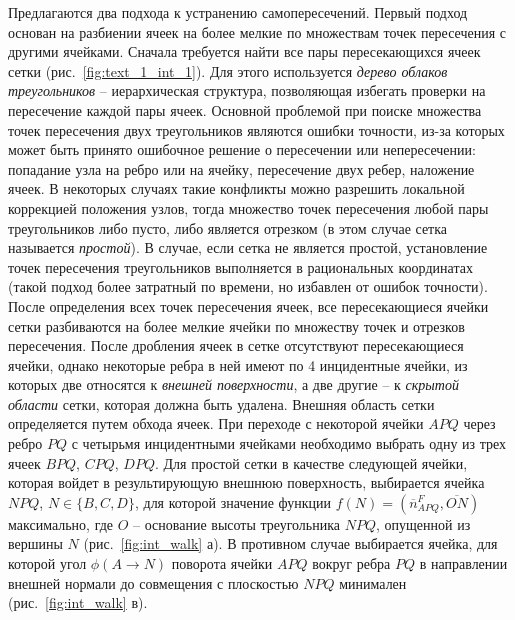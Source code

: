 \documentclass[a4paper,14pt]{extarticle}                     %
\theoremstyle{plain}                                         %
\begin{document}
Предлагаются два подхода к устранению самопересечений.
Первый подход основан на разбиении ячеек на более мелкие по множествам точек пересечения с другими ячейками.
Сначала требуется найти все пары пересекающихся ячеек сетки (рис.~\ref{fig:text_1_int_1}).
Для этого используется \textit{дерево облаков треугольников} -- иерархическая структура, позволяющая избегать проверки на пересечение каждой пары ячеек.
Основной проблемой при поиске множества точек пересечения двух треугольников являются ошибки точности, из-за которых может быть принято ошибочное решение о пересечении или непересечении: попадание узла на ребро или на ячейку, пересечение двух ребер, наложение ячеек.
В некоторых случаях такие конфликты можно разрешить локальной коррекцией положения узлов, тогда множество точек пересечения любой пары треугольников либо пусто, либо является отрезком (в этом случае сетка называется \textit{простой}).
В случае, если сетка не является простой, установление точек пересечения треугольников выполняется в рациональных координатах (такой подход более затратный по времени, но избавлен от ошибок точности).
После определения всех точек пересечения ячеек, все пересекающиеся ячейки сетки разбиваются на более мелкие ячейки по множеству точек и отрезков пересечения.
После дробления ячеек в сетке отсутствуют пересекающиеся ячейки, однако некоторые ребра в ней имеют по 4 инцидентные ячейки, из которых две относятся к \textit{внешней поверхности}, а две другие -- к \textit{скрытой области} сетки, которая должна быть удалена.
Внешняя область сетки определяется путем обхода ячеек.
При переходе с некоторой ячейки $APQ$ через ребро $PQ$ с четырьмя инцидентными ячейками необходимо выбрать одну из трех ячеек $BPQ$, $CPQ$, $DPQ$.
Для простой сетки в качестве следующей ячейки, которая войдет в результирующую внешнюю поверхность, выбирается ячейка $NPQ$, $N \in \{ B, C, D \}$, для которой значение функции $f(N) = (\overline{n}_{APQ}^F, \overline{ON})$ максимально, где $O$ -- основание высоты треугольника $NPQ$, опущенной из вершины $N$ (рис.~\ref{fig:int_walk} а).
В противном случае выбирается ячейка, для которой угол $\phi(A \rightarrow N)$ поворота ячейки $APQ$ вокруг ребра $PQ$ в направлении внешней нормали до совмещения с плоскостью $NPQ$ минимален (рис.~\ref{fig:int_walk} в).
\end{document}
